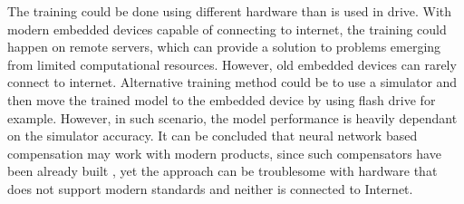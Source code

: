 The training could be done using different hardware than is used in drive. With modern embedded devices capable of connecting to internet, the training could happen on remote servers, which can provide a solution to problems emerging from limited computational resources. However, old embedded devices can rarely connect to internet. Alternative training method could be to use a simulator and then move the trained model to the embedded device by using flash drive for example. However, in such scenario, the model performance is heavily dependant on the simulator accuracy. It can be concluded that neural network based compensation may work with modern products, since such compensators have been already built \cite{CTR_SW:2017}, yet the approach can be troublesome with hardware that does not support modern standards and neither is connected to Internet.



\clearpage
